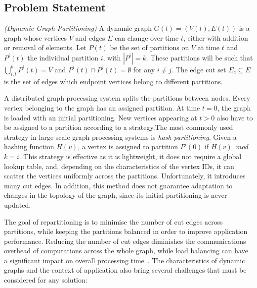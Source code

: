 \documentclass{sig-alternate-10pt}
\newenvironment{definition}[1][Definition]{\begin{trivlist}
\item[\hskip \labelsep {\bfseries #1}]}{\end{trivlist}}
\begin{document}
\subsection{Problem Statement}

\begin{definition} 

\emph{(Dynamic Graph Partitioning)}
A dynamic graph $G(t) = (V(t), E(t) )$ is a graph whose vertices $V$ and edges $E$ can change over time $t$, either with addition or removal of elements. Let $P(t)$ be the set of partitions on $V$ at time $t$ and  $P^{i}(t)$ the individual partition $i$, with $|P^{i}| = k$. These partitions will be such that $\bigcup\limits_{i,t}^{k} P^{i}(t) = V$ and $P^{i}(t) \cap P^{j}(t) = \emptyset$ for any $i \neq j$. The edge cut set $E_{c}\subseteq E$ is the set of edges which endpoint vertices belong to different partitions.
\end{definition}

A distributed graph processing system splits the partitions between nodes. Every vertex belonging to the graph has an assigned partition.  At time $t = 0$, the graph is loaded  with an initial partitioning.  New vertices appearing at $t > 0$ also have to be assigned to a partition according to a strategy.The most commonly used strategy in large-scale graph processing systems is \emph{hash partitioning}. Given a hashing function $H(v)$, a vertex is assigned to partition $P^{i}(0)$ if $H(v)$~\emph{mod}~$k = i$. This strategy is effective as it is lightweight, it does not require a global lookup table, and, depending on the characteristics of the vertex IDs, it can scatter the vertices uniformly across the partitions. Unfortunately, it introduces many cut edges. In addition, this method does not guarantee adaptation to changes in the topology of the graph, since its initial partitioning is never updated. 

The goal of repartitioning is to minimise the number of cut edges across partitions, while keeping the partitions balanced in order to improve application performance. Reducing the number of cut edges diminishes the communications overhead of computations across the whole graph, while load balancing can have a significant impact on overall processing time~\cite{Malewicz2009}. The characteristics of dynamic graphs and the context of application also bring several challenges that must be considered for any solution:
\end{document}
